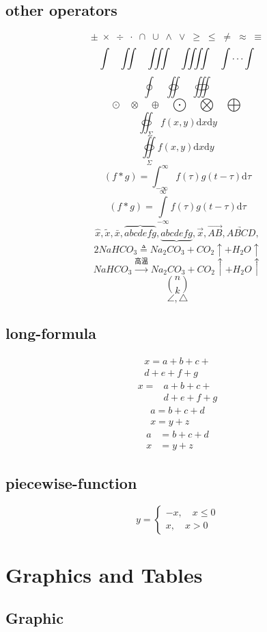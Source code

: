 \documentclass[12pt]{ctexart}
\begin{document}
\subsection{other operators}
\[\pm\;\times\;\div\;\cdot\;\cap\;\cup\;\wedge\;\vee\;\geq\;\leq\;\neq\;\approx\;\equiv\]
\[\int\quad\iint\quad\iiint\quad\iiiint\quad\idotsint\]
\[\oint\quad\oiint\quad\oiiint\]
\[\odot\quad\otimes\quad\oplus\quad\bigodot\quad\bigotimes\quad\bigoplus\]
\[\oiint_\Sigma f(x,y)\mathrm{d}x\mathrm{d}y\]
\[\oiint\limits_\Sigma f(x,y)\mathrm{d}x\mathrm{d}y\]
\[(f\ast g)=\int_{-\infty}^{\infty} f(\tau)g(t-\tau)\mathrm{d}\tau\]
\[(f\ast g)=\int\limits_{-\infty}^{\infty} f(\tau)g(t-\tau)\mathrm{d}\tau\]
\[\hat{x},\tilde{x},\bar{x},\overbrace{abcdefg},\underbrace{abcdefg},\vec{x},\overrightarrow{AB},\underrightarrow{ABCD},\]
\[2NaHCO_3\triangleq Na_2CO_3+CO_2\uparrow+H_2O\uparrow\]
\[NaHCO_3\overset{\text{高温}}{\longrightarrow}Na_2CO_3+CO_2\uparrow+H_2O\uparrow\]
\[\binom{n}{k}\]
\[\angle,\triangle\]%
\subsection{long-formula}
\begin{multline}
    x=a+b+c+{}\\
    d+e+f+g
\end{multline}
\[\begin{aligned}
    x={}&a+b+c+{}\\
    &d+e+f+g
\end{aligned}\]
\begin{gather}
    a=b+c+d\\
    x=y+z
\end{gather}
\begin{align}
    a&=b+c+d\\
    x&=y+z
\end{align}
\subsection{piecewise-function}
\[
    y=\begin{cases}
        -x,\quad x\leq0\\
        x,\quad x>0
    \end{cases}
\]
\section{Graphics and Tables}
\subsection{Graphic}
\end{document}

